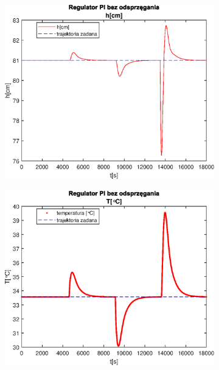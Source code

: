 \begin{figure}[h!]
   \centering
   \begin{subfigure}[b]{0.4\textwidth}
      \includegraphics[width=1\linewidth]{img/PI/noDecoupler/disturbance/PINoDecouplerH3DisttrueLinfalse.eps}
      \caption{}
      \label{fig:fig:PIDecoupler3DisttrueLinfalse1}
   \end{subfigure}
       
   \begin{subfigure}[b]{0.4\textwidth}
      \includegraphics[width=1\linewidth]{img/PI/noDecoupler/disturbance/PINoDecouplerT3DisttrueLinfalse.eps}
      \caption{}
      \label{fig:fig:PIDecoupler3DisttrueLinfalse2}
   \end{subfigure}
       

\end{figure}
